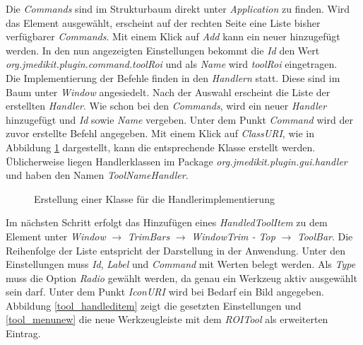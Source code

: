 Die \textit{Commands} sind im Strukturbaum direkt unter \textit{Application} zu finden. Wird das Element ausgewählt, erscheint auf der rechten Seite eine Liste bisher verfügbarer \textit{Commands}. Mit einem Klick auf \textit{Add} kann ein neuer hinzugefügt werden. In den nun angezeigten Einstellungen bekommt die \textit{Id} den Wert \textit{org.jmedikit.plugin.command.toolRoi} und als \textit{Name} wird \textit{toolRoi} eingetragen.\\
Die Implementierung der Befehle finden in den \textit{Handlern} statt. Diese sind im Baum unter \textit{Window} angesiedelt. Nach der Auswahl erscheint die Liste der erstellten \textit{Handler}. Wie schon bei den \textit{Commands}, wird ein neuer \textit{Handler} hinzugefügt und \textit{Id} sowie \textit{Name} vergeben. Unter dem Punkt \textit{Command} wird der zuvor erstellte Befehl angegeben. Mit einem Klick auf \textit{ClassURI}, wie in Abbildung \ref{tool_handlerclass} dargestellt, kann die entsprechende Klasse erstellt werden. Üblicherweise liegen Handlerklassen im Package \textit{org.jmedikit.plugin.gui.handler} und haben den Namen \textit{ToolNameHandler}.

\begin{figure}[H]
  \vspace{0.5cm}
  \centering
   \caption{Erstellung einer Klasse für die Handlerimplementierung}
  \label{tool_handlerclass}
  \vspace{0.5cm}
\end{figure}

Im nächsten Schritt erfolgt das Hinzufügen eines \textit{HandledToolItem} zu dem Element unter \textit{Window} $\rightarrow$ \textit{TrimBars} $\rightarrow$ \textit{WindowTrim - Top} $\rightarrow$ \textit{ToolBar}. Die Reihenfolge der Liste entspricht der Darstellung in der Anwendung. Unter den Einstellungen muss \textit{Id}, \textit{Label} und \textit{Command} mit Werten belegt werden. Als \textit{Type} muss die Option \textit{Radio} gewählt werden, da genau ein Werkzeug aktiv ausgewählt sein darf. Unter dem Punkt \textit{IconURI} wird bei Bedarf ein Bild angegeben. Abbildung \ref{tool_handleditem} zeigt die gesetzten Einstellungen und \ref{tool_menunew} die neue Werkzeugleiste mit dem \textit{ROITool} als erweiterten Eintrag.

